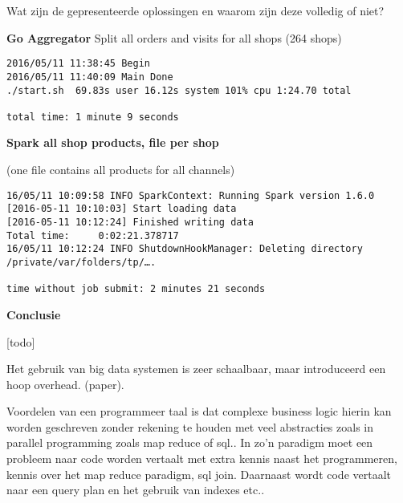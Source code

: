Wat zijn de gepresenteerde oplossingen en waarom zijn deze volledig of niet?

\textbf{Go Aggregator}
Split all orders and visits for all shops (264 shops)

\begin{lstlisting}
2016/05/11 11:38:45 Begin
2016/05/11 11:40:09 Main Done
./start.sh  69.83s user 16.12s system 101% cpu 1:24.70 total

total time: 1 minute 9 seconds
\end{lstlisting}

\textbf{Spark all shop products, file per shop}

(one file contains all products for all channels)

\begin{lstlisting}
16/05/11 10:09:58 INFO SparkContext: Running Spark version 1.6.0
[2016-05-11 10:10:03] Start loading data
[2016-05-11 10:12:24] Finished writing data
Total time:     0:02:21.378717
16/05/11 10:12:24 INFO ShutdownHookManager: Deleting directory /private/var/folders/tp/….

time without job submit: 2 minutes 21 seconds
\end{lstlisting}


\textbf{Conclusie}

[todo]

Het gebruik van big data systemen is zeer schaalbaar, maar introduceerd een hoop overhead. (paper).

Voordelen van een programmeer taal is dat complexe business logic hierin kan worden geschreven zonder rekening te houden met veel abstracties zoals in parallel programming zoals map reduce of sql.. In zo'n paradigm moet een probleem naar code worden vertaalt met extra kennis naast het programmeren, kennis over het map reduce paradigm, sql join. Daarnaast wordt code vertaalt naar een query plan en het gebruik van indexes etc..

